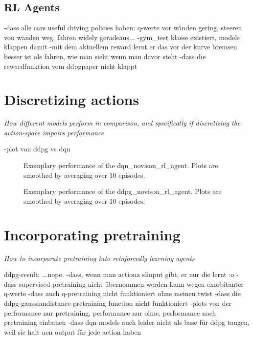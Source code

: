 \subsection{RL Agents}

-dass alle cars useful driving policies haben: q-werte vor wänden gering, steeren von wänden weg, fahren widely geradeaus... 
-gym\_test klasse existiert, models klappen damit
-mit dem aktuellem reward lernt er das vor der kurve bremsen besser ist als fahren, wie man sieht wenn man davor steht
-dass die rewardfunktion vom ddpgpaper nicht klappt



\section{Discretizing actions}

\textit{How different models perform in comparison, and specifically if discretizing the action-space impairs performance}

-plot von ddpg vs dqn

\begin{figure}[h!]
		{%
			\setlength{\fboxsep}{0pt}%
			\setlength{\fboxrule}{1pt}%
		}%
	\centering
	\caption[Exemplary performance of the dqn\_novison\_rl\_agent]{Exemplary performance of the dqn\_novison\_rl\_agent. Plots are smoothed by averaging over 10 episodes.}
	\label{fig:dqn_result}
\end{figure}


\begin{figure}[h!]
{%
	\setlength{\fboxsep}{0pt}%
	\setlength{\fboxrule}{1pt}%
}%
\centering
\caption[Exemplary performance of the ddpg\_novison\_rl\_agent]{Exemplary performance of the ddpg\_novison\_rl\_agent. Plots are smoothed by averaging over 10 episodes.}
\label{fig:ddpg_result}
\end{figure}


\section{Incorporating pretraining}
\textit{How to incorporate pretraining into reinforcedly learning agents}

ddpg-result: ...nope.
-dass, wenn man actiona slinput gibt, er nur die lernt :o
-dass supervised pretraining nicht übernommen werden kann wegen exorbitanter q-werte
-dass auch q-pretraining nicht funktioniert ohne meinen twist
-dass die ddpg-gaussiandistance-pretraining function nicht funktioniert
-plots von der performance nur pretraining, performance nur ohne, performance nach pretraining einbauen
-dass dqn-models auch leider nicht als base für ddpg taugen, weil sie halt nen output für jede action haben

